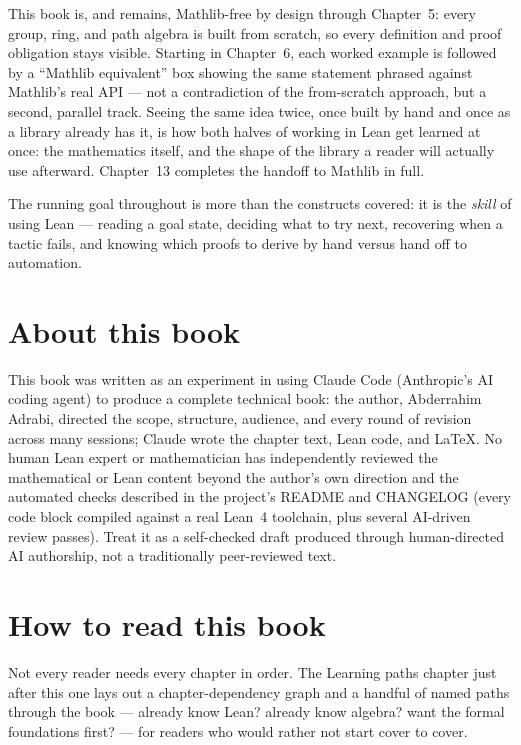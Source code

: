 This book is, and remains, Mathlib-free by design through Chapter~5: every
group, ring, and path algebra is built from scratch, so every definition
and proof obligation stays visible. Starting in Chapter~6, each worked
example is followed by a ``Mathlib equivalent'' box showing the same
statement phrased against Mathlib's real API --- not a contradiction of
the from-scratch approach, but a second, parallel track. Seeing the same
idea twice, once built by hand and once as a library already has it, is
how both halves of working in Lean get learned at once: the mathematics
itself, and the shape of the library a reader will actually use
afterward. Chapter~13 completes the handoff to Mathlib in full.

The running goal throughout is more than the constructs covered: it is
the \emph{skill} of using Lean --- reading a goal state, deciding what to
try next, recovering when a tactic fails, and knowing which proofs to
derive by hand versus hand off to automation.

\chapter*{About this book}
This book was written as an experiment in using Claude Code (Anthropic's
AI coding agent) to produce a complete technical book: the author,
Abderrahim Adrabi, directed the scope, structure, audience, and every
round of revision across many sessions; Claude wrote the chapter text,
Lean code, and LaTeX. No human Lean expert or mathematician has
independently reviewed the mathematical or Lean content beyond the
author's own direction and the automated checks described in the
project's README and CHANGELOG (every code block compiled against a real
Lean~4 toolchain, plus several AI-driven review passes). Treat it as a
self-checked draft produced through human-directed AI authorship, not a
traditionally peer-reviewed text.

\chapter*{How to read this book}

Not every reader needs every chapter in order. The Learning paths chapter
just after this one lays out a chapter-dependency graph and a handful of
named paths through the book --- already know Lean? already know algebra?
want the formal foundations first? --- for readers who would rather not
start cover to cover.


